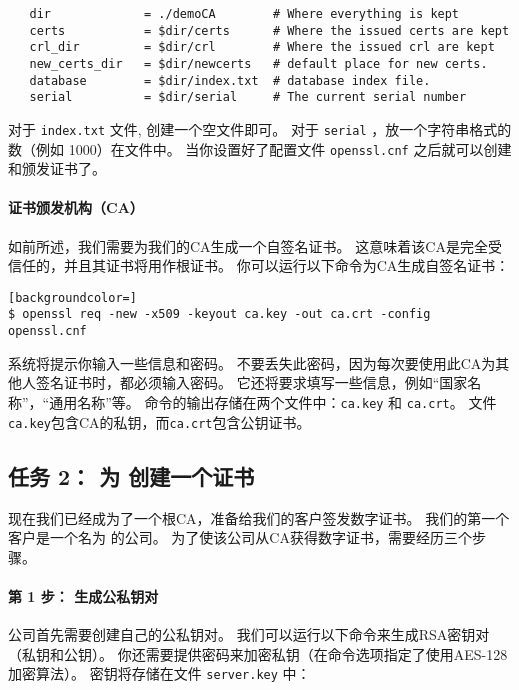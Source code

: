 \begin{lstlisting}
   dir             = ./demoCA        # Where everything is kept
   certs           = $dir/certs      # Where the issued certs are kept
   crl_dir         = $dir/crl        # Where the issued crl are kept
   new_certs_dir   = $dir/newcerts   # default place for new certs.
   database        = $dir/index.txt  # database index file.
   serial          = $dir/serial     # The current serial number
\end{lstlisting}

对于 \texttt{index.txt} 文件, 创建一个空文件即可。
对于 \texttt{serial} ，放一个字符串格式的数（例如 1000）在文件中。
当你设置好了配置文件 \texttt{openssl.cnf} 之后就可以创建和颁发证书了。


\paragraph{证书颁发机构（CA）}
如前所述，我们需要为我们的CA生成一个自签名证书。
这意味着该CA是完全受信任的，并且其证书将用作根证书。
你可以运行以下命令为CA生成自签名证书：

\begin{lstlisting}[backgroundcolor=]
$ openssl req -new -x509 -keyout ca.key -out ca.crt -config openssl.cnf
\end{lstlisting}

系统将提示你输入一些信息和密码。
不要丢失此密码，因为每次要使用此CA为其他人签名证书时，都必须输入密码。
它还将要求填写一些信息，例如“国家名称”，“通用名称”等。
命令的输出存储在两个文件中：{\tt ca.key} 和 {\tt ca.crt}。
文件{\tt ca.key}包含CA的私钥，而{\tt ca.crt}包含公钥证书。



\subsection{任务 2： 为 \pkiserver 创建一个证书}

现在我们已经成为了一个根CA，准备给我们的客户签发数字证书。
我们的第一个客户是一个名为 \pkiserver 的公司。
为了使该公司从CA获得数字证书，需要经历三个步骤。

\paragraph{第 1 步： 生成公私钥对}
公司首先需要创建自己的公私钥对。
我们可以运行以下命令来生成RSA密钥对（私钥和公钥）。
你还需要提供密码来加密私钥（在命令选项指定了使用AES-128加密算法）。
密钥将存储在文件 \texttt{server.key} 中：

